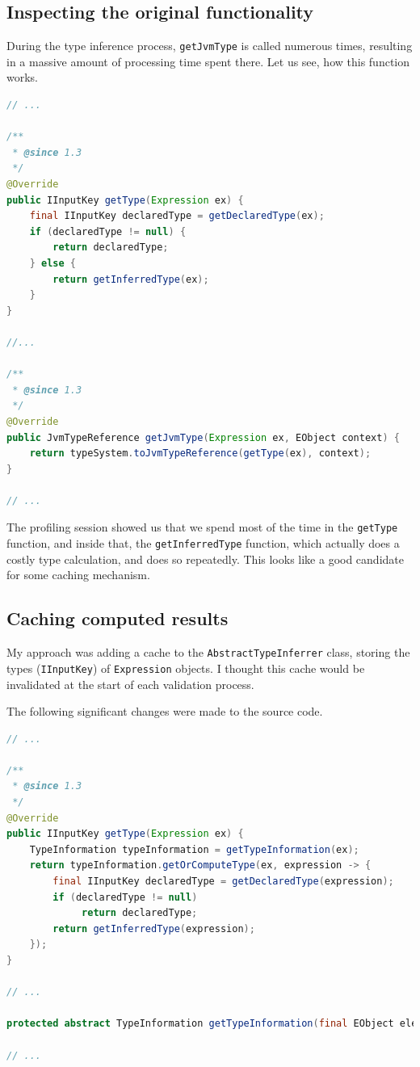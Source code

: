 \documentclass[11pt,a4paper,oneside]{report}
\begin{document}
\subsection{Inspecting the original functionality}
During the type inference process, \texttt{getJvmType} is called numerous times,
resulting in a massive amount of processing time spent there. Let us see, how
this function works.

\begin{lstlisting}[caption={Original source code of \texttt{getType}}, language=java]
// ...

/**
 * @since 1.3
 */
@Override
public IInputKey getType(Expression ex) {
    final IInputKey declaredType = getDeclaredType(ex);
    if (declaredType != null) {
        return declaredType;
    } else {
        return getInferredType(ex);
    }
}

//...

/**
 * @since 1.3
 */
@Override
public JvmTypeReference getJvmType(Expression ex, EObject context) {
    return typeSystem.toJvmTypeReference(getType(ex), context);
}

// ...
\end{lstlisting}

The profiling session showed us that we spend most of the time in the
\texttt{getType} function, and inside that, the \texttt{getInferredType}
function, which actually does a costly type calculation, and does so repeatedly.
This looks like a good candidate for some caching mechanism.

\subsection{Caching computed results}
My approach was adding a cache to the \texttt{AbstractTypeInferrer} class,
storing the types (\texttt{IInputKey}) of \texttt{Expression} objects. I thought
this cache would be invalidated at the start of each validation process.

The following significant changes were made to the source code.

\begin{lstlisting}[caption={AbstractTypeInferrer.java}, language=java]
// ...

/**
 * @since 1.3
 */
@Override
public IInputKey getType(Expression ex) {
    TypeInformation typeInformation = getTypeInformation(ex);
    return typeInformation.getOrComputeType(ex, expression -> {
        final IInputKey declaredType = getDeclaredType(expression);
        if (declaredType != null)
             return declaredType;
        return getInferredType(expression);
    });
}

// ...

protected abstract TypeInformation getTypeInformation(final EObject element);

// ...
\end{lstlisting}
\end{document}
